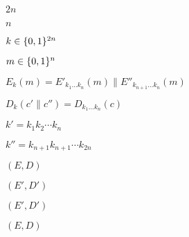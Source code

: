 \documentclass[10pt]{book}
\begin{document}
\begin{mdSnippets}
\begin{mdInlineSnippet}[21e2c0c0472b331622877accbe29b91b]%
$2n$\end{mdInlineSnippet}%
\begin{mdInlineSnippet}[7b8b965ad4bca0e41ab51de7b31363a1]%
$n$\end{mdInlineSnippet}%
\begin{mdInlineSnippet}%
$k\in \{0,1\}^{2n}$\end{mdInlineSnippet}%
\begin{mdInlineSnippet}[9e94cc9cc74df463719212b8a3152980]%
$m\in\{0,1\}^n$\end{mdInlineSnippet}%
\begin{mdInlineSnippet}%
$E_k(m)=E'_{k_1\ldots k_n}(m)\|E''_{k_{n+1}\ldots k_n}(m)$\end{mdInlineSnippet}%
\begin{mdInlineSnippet}[60ac855477764912a96e93e2da6199af]%
$D_k(c'\|c'')=D_{k_1\ldots k_n}(c)$\end{mdInlineSnippet}%
\begin{mdInlineSnippet}[2079c9f8ce87043f891f8c63fe7fa566]%
$k' = k_1k_2\cdots k_n$\end{mdInlineSnippet}%
\begin{mdInlineSnippet}%
$k'' = k_{n+1}k_{n+1} \cdots k_{2n}$\end{mdInlineSnippet}%
\begin{mdInlineSnippet}[c150726dc018e82825c0c3617f46a1c9]%
$(E,D)$\end{mdInlineSnippet}%
\begin{mdInlineSnippet}%
$(E',D')$\end{mdInlineSnippet}%
\begin{mdInlineSnippet}%
$(E',D')$\end{mdInlineSnippet}%
\begin{mdInlineSnippet}[c150726dc018e82825c0c3617f46a1c9]%
$(E,D)$\end{mdInlineSnippet}%
\begin{mdInlineSnippet}[7fc56270e7a70fa81a5935b72eacbe29]%

\end{mdInlineSnippet}
\end{mdSnippets}
\end{document}
